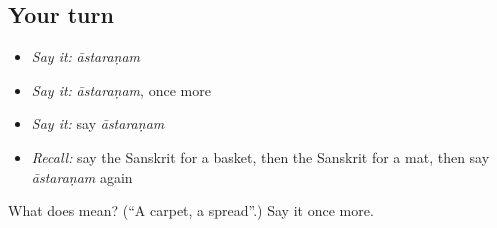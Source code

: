 \subsection*{Your turn}
\begin{itemize}
\raggedright
  \item \emph{Say it:} \emph{āstaraṇam}
  \item \emph{Say it:} \emph{āstaraṇam}, once more
  \item \emph{Say it:} say \emph{āstaraṇam}
  \item \emph{Recall:} say the Sanskrit for a basket, then the Sanskrit for a mat, then say \emph{āstaraṇam} again
\end{itemize}

\begin{tcolorbox}[breakable,colback=teal!4,colframe=teal!35!black,title={Before you move on}]
What does  mean? (\textquotedblleft{}A carpet, a spread\textquotedblright{}.) Say it once more.
\end{tcolorbox}

